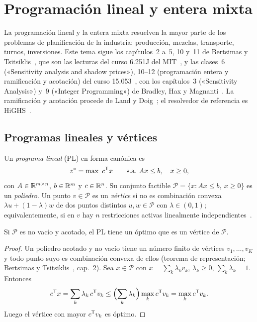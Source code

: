 \chapter{Programación lineal y entera mixta}
\label{tema:2}

La programación lineal y la entera mixta resuelven la mayor parte de los problemas de planificación de la industria: producción, mezclas, transporte, turnos, inversiones. Este tema sigue los capítulos~2 a~5, 10 y~11 de Bertsimas y Tsitsiklis~\cite{bt}, que son las lecturas del curso 6.251J del MIT~\cite{mit6251}, y las clases~6 («Sensitivity analysis and shadow prices»), 10--12 (programación entera y ramificación y acotación) del curso 15.053~\cite{mit15053}, con los capítulos~3 («Sensitivity Analysis») y~9 («Integer Programming») de Bradley, Hax y Magnanti~\cite{amp}. La ramificación y acotación procede de Land y Doig~\cite{landdoig}; el resolvedor de referencia es HiGHS~\cite{highs,hh}.

\section{Programas lineales y vértices}

\begin{definicion}\label{def:pl}
Un \emph{programa lineal} (PL) en forma canónica es
\[
z^{*}=\max\ c^{\mathsf{T}} x\qquad\text{s.a.}\  Ax\le b,\quad x\ge 0,
\]
con $A\in\mathbb{R}^{m\times n}$, $b\in\mathbb{R}^{m}$ y $c\in\mathbb{R}^{n}$. Su conjunto factible $\mathcal{P}=\{x: Ax\le b,\ x\ge 0\}$ es un \emph{poliedro}. Un punto $v\in\mathcal{P}$ es un \emph{vértice} si no es combinación convexa $\lambda u+(1-\lambda)w$ de dos puntos distintos $u,w\in\mathcal{P}$ con $\lambda\in(0,1)$; equivalentemente, si en $v$ hay $n$ restricciones activas linealmente independientes~\cite{bt}.
\end{definicion}

\begin{teorema}\label{teo:vertice}
Si $\mathcal{P}$ es no vacío y acotado, el PL tiene un óptimo que es un vértice de $\mathcal{P}$.
\end{teorema}

\begin{proof}
Un poliedro acotado y no vacío tiene un número finito de vértices $v_1,\dots,v_K$ y todo punto suyo es combinación convexa de ellos (teorema de representación; Bertsimas y Tsitsiklis~\cite{bt}, cap.~2). Sea $x\in\mathcal{P}$ con $x=\sum_k\lambda_kv_k$, $\lambda_k\ge 0$, $\sum_k\lambda_k=1$. Entonces
\[
c^{\mathsf{T}} x=\sum_k\lambda_k\,c^{\mathsf{T}} v_k\le\Bigl(\sum_k\lambda_k\Bigr)\max_k c^{\mathsf{T}} v_k=\max_k c^{\mathsf{T}} v_k .
\]
Luego el vértice con mayor $c^{\mathsf{T}} v_k$ es óptimo.
\end{proof}


